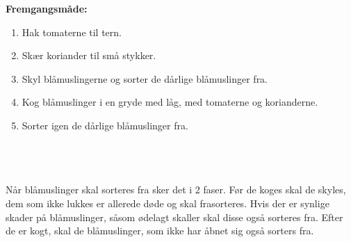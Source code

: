 \documentclass{book}
\begin{document}
\begin{minipage}[t]{0.5\textwidth}
\textbf{Fremgangsmåde:}
\begin{enumerate}
    \item Hak tomaterne til tern.
    \item Skær koriander til små stykker.
    \item Skyl blåmuslingerne og sorter de dårlige blåmuslinger fra.
    \item Kog blåmuslinger i en gryde med låg, med tomaterne og korianderne.
    \item Sorter igen de dårlige blåmuslinger fra.
\end{enumerate}
\end{minipage}
\\ \\ \\ 
Når blåmuslinger skal sorteres fra sker det i 2 faser. Før de koges skal de skyles, dem som ikke lukkes er allerede døde og skal frasorteres. Hvis der er synlige skader på blåmuslinger, såsom ødelagt skaller skal disse også sorteres fra. Efter de er kogt, skal de blåmuslinger, som ikke har åbnet sig også sorters fra.
\newpage
\end{document}
